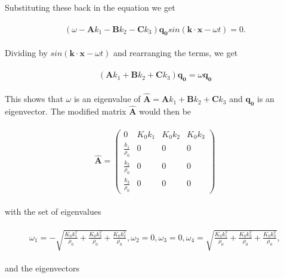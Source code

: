 Substituting these back in the equation we get

\begin{align}
    \begin{split}
        \left(\omega - \mathbf{A}k_1 - \mathbf{B}k_2 - \mathbf{C}k_3\right)\mathbf{q_0}sin\left(\mathbf{k}\cdot\mathbf{x} - \omega t\right) = 0.
    \end{split}
\end{align}

Dividing by $sin\left(\mathbf{k}\cdot\mathbf{x} - \omega t\right)$ and rearranging the terms, we get

\begin{align}
    \begin{split}
        \left(\mathbf{A}k_1 + \mathbf{B}k_2 + \mathbf{C}k_3\right)\mathbf{q_0} = \omega \mathbf{q_0}
    \end{split}
\end{align}

This shows that $\omega$ is an eigenvalue of $\mathbf{\hat{A}} = \mathbf{A}k_1 + \mathbf{B}k_2 + \mathbf{C}k_3$ and $\mathbf{q_0}$ is an eigenvector. The modified matrix $\mathbf{\hat{A}}$ would then be

\begin{align}
    \begin{split}
    \mathbf{\hat{A}} = \left(\begin{array}{rrrr}
0 & K_{0} k_{1} & K_{0} k_{2} & K_{0} k_{3} \\
\frac{k_{1}}{\rho_{0}} & 0 & 0 & 0 \\
\frac{k_{2}}{\rho_{0}} & 0 & 0 & 0 \\
\frac{k_{3}}{\rho_{0}} & 0 & 0 & 0
\end{array}\right)
    \end{split}
\end{align}

with the set of eigenvalues

\begin{align}
    \begin{split}
        \omega_1 = -\sqrt{\frac{K_{0} k_{1}^{2}}{\rho_{0}} + \frac{K_{0} k_{2}^{2}}{\rho_{0}} + \frac{K_{0} k_{3}^{2}}{\rho_{0}}},
        \omega_2 = 0,
        \omega_3 = 0,
        \omega_4 = \sqrt{\frac{K_{0} k_{1}^{2}}{\rho_{0}} + \frac{K_{0} k_{2}^{2}}{\rho_{0}} + \frac{K_{0} k_{3}^{2}}{\rho_{0}}}, 
    \end{split}
\end{align}

and the eigenvectors

